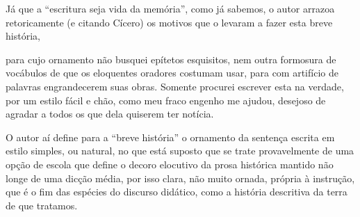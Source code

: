 Já que a ``escritura seja vida da memória'',
como já sabemos, o autor arrazoa retoricamente (e citando Cícero) os
motivos que o levaram a fazer esta breve história, 

\begin{hedraquote}
para cujo ornamento não busquei epítetos
esquisitos, nem outra formosura de vocábulos de que os eloquentes
oradores costumam usar, para com artifício de palavras engrandecerem
suas obras. Somente procurei escrever esta na verdade, por um estilo
fácil e chão, como meu fraco engenho me ajudou, desejoso de agradar a
todos os que dela quiserem ter notícia.
\end{hedraquote}

O autor aí define para a ``breve história'' o
ornamento da sentença escrita em estilo simples, ou natural, no que
está suposto que se trate provavelmente de uma opção de escola que
define o decoro elocutivo da prosa histórica mantido não longe de uma
dicção média, por isso clara, não muito ornada, própria à instrução,
que é o fim das espécies do discurso didático, como a história
descritiva da terra de que tratamos.

